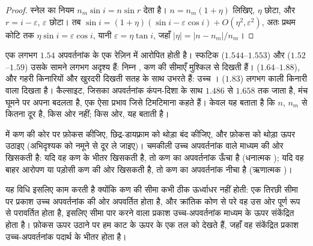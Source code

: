 \begin{proof}
स्नेल का नियम $n_m \sin i = n \sin r$ देता है। $n = n_m(1 + \eta)$ लिखिए, $\eta$ छोटा, और $r = i - \varepsilon$, $\varepsilon$
छोटा। तब $\sin i = (1 + \eta)(\sin i - \varepsilon\cos i) + O(\eta^2, \varepsilon^2)$, अतः प्रथम कोटि तक
$\eta \sin i = \varepsilon\cos i$, यानी $\varepsilon = \eta\tan i$, जहाँ $|\eta| = |n - n_m|/n_m$।
\end{proof}

एक  लगभग $1.54$ अपवर्तनांक के एक रेज़िन में आरोपित होती है।
स्फटिक ($1.544$--$1.553$) और  ($1.52$--$1.59$) उसके सामने लगभग अदृश्य हैं: निम्न , कण की सीमाएँ मुश्किल
से दिखती हैं।  ($1.64$--$1.88$),  और  गहरी किनारियों और खुरदरी दिखती सतह के साथ उभरते हैं:
उच्च ।  ($1.83$) लगभग काली किनारी वाला दिखता है। कैल्साइट, जिसका अपवर्तनांक कंपन-दिशा के साथ
$1.486$ से $1.658$ तक जाता है, मंच घूमने पर अपना  बदलता है, एक ऐसा प्रभाव जिसे टिमटिमाना कहते हैं।
 केवल यह बताता है कि $n$, $n_m$ से कितना दूर है, किस ओर नहीं; किस ओर, यह  बताती है।

\begin{method}[बेक रेखा परीक्षण]\label{met:b1:optical-mineralogy:becke}
 में कण की कोर पर फ़ोकस कीजिए, छिद्र-डायफ़्राम को थोड़ा बंद कीजिए, और फ़ोकस को थोड़ा ऊपर
उठाइए (अभिदृश्यक को नमूने से दूर ले जाइए)। चमकीली  उच्च अपवर्तनांक वाले माध्यम की ओर खिसकती है: यदि वह
कण के भीतर खिसकती है, तो कण का अपवर्तनांक ऊँचा है (धनात्मक ); यदि वह बाहर आरोपण या पड़ोसी कण की ओर खिसकती है,
तो कण का अपवर्तनांक नीचा है (ऋणात्मक )।
\end{method}

यह विधि इसलिए काम करती है क्योंकि कण की सीमा कभी ठीक ऊर्ध्वाधर नहीं होती: एक तिरछी सीमा पर प्रकाश उच्च अपवर्तनांक
की ओर अपवर्तित होता है, और क्रांतिक कोण से परे वह उस ओर पूर्ण रूप से परावर्तित होता है, इसलिए सीमा पार करने वाला
प्रकाश उच्च-अपवर्तनांक माध्यम के ऊपर संकेंद्रित होता है। फ़ोकस ऊपर उठाने पर हम काट के ऊपर के एक तल को देखते हैं,
जहाँ वह संकेंद्रित प्रकाश उच्च-अपवर्तनांक पदार्थ के भीतर होता है।

